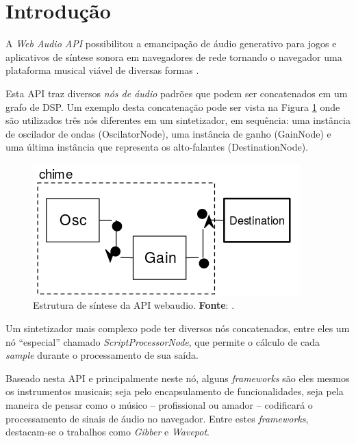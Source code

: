 \section{Introdução}\label{sec:gen}




A \emph{Web Audio API} \cite{w3c_web_2012} possibilitou a emancipação de áudio generativo para jogos e aplicativos de síntese sonora em navegadores de rede tornando o navegador uma plataforma musical viável de diversas formas \cite{roberts_web_2013,wyse_viability_2014}.

% 
Esta API traz diversos \emph{nós de áudio} padrões que podem ser concatenados em um grafo de DSP.
Um exemplo desta concatenação pode ser vista na Figura \ref{fig:shime} onde são utilizados três nós diferentes em um sintetizador, em sequência: uma instância de oscilador de ondas (OscilatorNode), uma instância de ganho (GainNode) e uma última instância que representa os alto-falantes (DestinationNode).

\begin{figure}[h]
\centering
\includegraphics[scale=0.35]{chime.png}
\caption{Estrutura de síntese da API webaudio. \textbf{Fonte}: \cite{srikumar_tamming_2013}.}
\label{fig:shime}
\end{figure}

Um sintetizador mais complexo pode ter diversos nós concatenados, entre eles um nó ``especial'' chamado \emph{ScriptProcessorNode}, que permite o cálculo de cada \emph{sample} durante o processamento de sua saída.

Baseado nesta API e principalmente neste nó, alguns \emph{frameworks} são eles mesmos os instrumentos musicais; seja pelo encapsulamento de funcionalidades, seja pela maneira de pensar como o músico -- profissional ou amador -- codificará o processamento de sinais de áudio no navegador.
Entre estes \emph{frameworks}, destacam-se o trabalhos como \emph{Gibber} e \emph{Wavepot}. 

